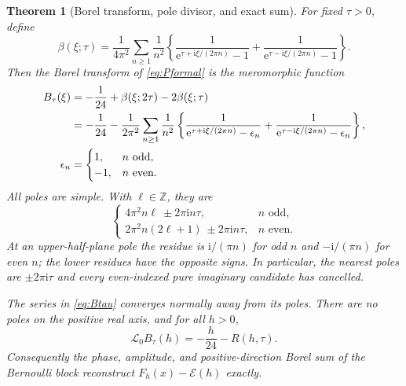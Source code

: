 \documentclass[11pt,a4paper]{article}
\newtheorem{theorem}{Theorem}[section]
\theoremstyle{definition}
\theoremstyle{remark}
\newcommand{\e}{\mathrm e}
\newcommand{\ii}{\mathrm i}
\newcommand{\Ecal}{\mathcal E}
\begin{document}
\begin{theorem}[Borel transform, pole divisor, and exact sum]
\label{thm:borel}
For fixed $\tau>0$, define
\begin{equation}
 \beta(\xi;\tau)=\frac1{4\pi^2}\sum_{n\ge1}\frac1{n^2}
 \left\{\frac1{\e^{\tau+\ii\xi/(2\pi n)}-1}
             +\frac1{\e^{\tau-\ii\xi/(2\pi n)}-1}\right\}.
 \label{eq:beta}
\end{equation}
Then the Borel transform of \eqref{eq:Pformal} is the meromorphic function
\begin{align}
 B_\tau(\xi)&=-\frac1{24}+\beta(\xi;2\tau)-2\beta(\xi;\tau)\label{eq:Btau}\\
 &=-\frac1{24}-\frac1{2\pi^2}\sum_{n\ge1}\frac1{n^2}
 \left\{\frac1{\e^{\tau+\ii\xi/(2\pi n)}-\epsilon_n}
             +\frac1{\e^{\tau-\ii\xi/(2\pi n)}-\epsilon_n}\right\},\notag\\
 \epsilon_n&=\begin{cases}1,&n\text{ odd},\\-1,&n\text{ even}.
                    \end{cases}\notag
\end{align}
All poles are simple. With $\ell\in\mathbb Z$, they are
\begin{equation}
 \begin{cases}
 4\pi^2 n\ell\ \pm 2\pi\ii n\tau,&n\text{ odd},\\
 2\pi^2 n(2\ell+1)\ \pm 2\pi\ii n\tau,&n\text{ even}.
 \end{cases}
 \label{eq:poles}
\end{equation}
At an upper-half-plane pole the residue is $\ii/(\pi n)$ for odd $n$
and $-\ii/(\pi n)$ for even $n$; the lower residues have the opposite
signs. In particular, the nearest poles are $\pm2\pi\ii\tau$ and every
even-indexed pure imaginary candidate has cancelled.

The series in \eqref{eq:Btau} converges normally away from its poles.
There are no poles on the positive real axis, and for all $h>0$,
\begin{equation}
 \mathcal L_0 B_\tau(h)=-\frac h{24}-R(h,\tau).
 \label{eq:exactborelsum}
\end{equation}
Consequently the phase, amplitude, and positive-direction Borel sum of the
Bernoulli block reconstruct $F_h(x)-\Ecal(h)$ exactly.
\end{theorem}
\end{document}
